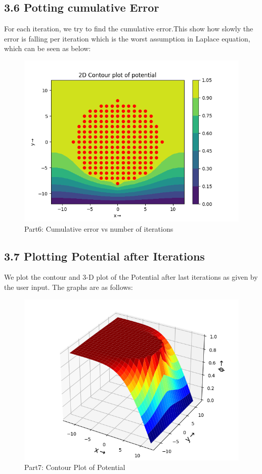 \documentclass[12pt, a4paper]{report}
\begin{document}
 \subsection*{3.6 Potting cumulative Error}
  For each iteration, we try to find the cumulative error.This show how slowly the error is falling per iteration which is the worst assumption in Laplace equation, which can be seen as below:
   \begin{figure}[H]
	\centering
	\includegraphics[scale=0.8]{Figure_7.png}
	\caption{Part6: Cumulative error vs number of iterations}
	\label{fig:7}
  \end{figure}
 
 \subsection*{3.7 Plotting Potential after Iterations}
  We plot the contour and 3-D plot of the Potential after last iterations as given by the user input. The graphs are as follows:
  
  \begin{figure}[H]
	\centering
	\includegraphics[scale=0.8]{Figure_8.png} 
	\caption{Part7: Contour Plot of Potential}
	\label{fig:8}
  \end{figure}
  
\end{document}
